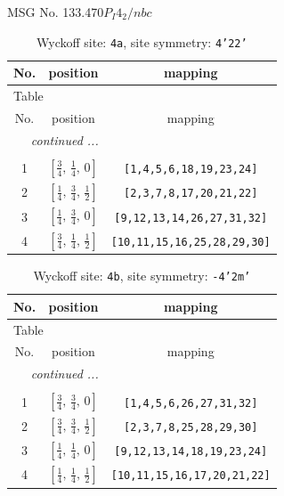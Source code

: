 \documentclass[fleqn,8pt]{jsarticle}
\begin{document}
\setcounter{MaxMatrixCols}{32}

\renewcommand{\tablename}{Table~}
\renewcommand{\figurename}{Figure~}
\begin{center}
\LARGE
MSG No. 133.470\quad$P_{I}4_{2}/nbc$
\end{center}
\renewcommand{\arraystretch}{1.2}
\begin{longtable}{ccc}
\caption{Wyckoff site: {\tt 4a}, site symmetry: {\tt 4'22'}}
 \\
 \hline \hline
No. & position & mapping \\ \hline \endfirsthead

\multicolumn{2}{l}{\tablename\ \thetable{}} \\
 \hline \hline
No. & position & mapping \\ \hline \endhead

 \hline \hline
\multicolumn{2}{r}{\footnotesize\it continued ...} \\ \endfoot

 \hline \hline
\multicolumn{2}{r}{} \\ \endlastfoot

1 & $\left[ \frac{3}{4},\, \frac{1}{4},\, 0 \right]$ & {\tt [1,4,5,6,18,19,23,24]} \\ \hline
2 & $\left[ \frac{1}{4},\, \frac{3}{4},\, \frac{1}{2} \right]$ & {\tt [2,3,7,8,17,20,21,22]} \\ \hline
3 & $\left[ \frac{1}{4},\, \frac{3}{4},\, 0 \right]$ & {\tt [9,12,13,14,26,27,31,32]} \\ \hline
4 & $\left[ \frac{3}{4},\, \frac{1}{4},\, \frac{1}{2} \right]$ & {\tt [10,11,15,16,25,28,29,30]} \\
\end{longtable}
\renewcommand{\arraystretch}{1.2}
\begin{longtable}{ccc}
\caption{Wyckoff site: {\tt 4b}, site symmetry: {\tt -4'2m'}}
 \\
 \hline \hline
No. & position & mapping \\ \hline \endfirsthead

\multicolumn{2}{l}{\tablename\ \thetable{}} \\
 \hline \hline
No. & position & mapping \\ \hline \endhead

 \hline \hline
\multicolumn{2}{r}{\footnotesize\it continued ...} \\ \endfoot

 \hline \hline
\multicolumn{2}{r}{} \\ \endlastfoot

1 & $\left[ \frac{3}{4},\, \frac{3}{4},\, 0 \right]$ & {\tt [1,4,5,6,26,27,31,32]} \\ \hline
2 & $\left[ \frac{3}{4},\, \frac{3}{4},\, \frac{1}{2} \right]$ & {\tt [2,3,7,8,25,28,29,30]} \\ \hline
3 & $\left[ \frac{1}{4},\, \frac{1}{4},\, 0 \right]$ & {\tt [9,12,13,14,18,19,23,24]} \\ \hline
4 & $\left[ \frac{1}{4},\, \frac{1}{4},\, \frac{1}{2} \right]$ & {\tt [10,11,15,16,17,20,21,22]} \\
\end{longtable}
\end{document}
